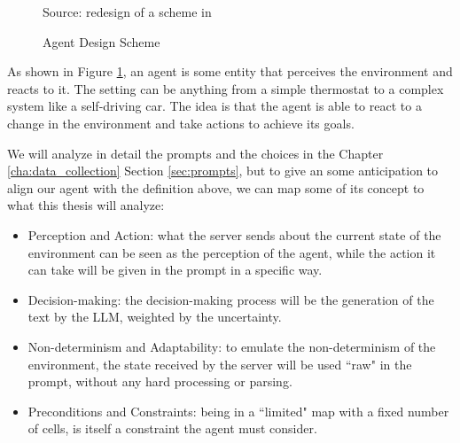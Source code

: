 \vspace{1cm} %
\begin{figure}[h!]
  \centering
  \caption{Agent Design Scheme}
  { Source: redesign of a scheme in \cite{wooldridge2002multiagent}} \label{fig:agent_scheme}
\end{figure}
\vspace{1cm} %

As shown in Figure \ref{fig:agent_scheme}, an agent is some entity that
perceives the environment and reacts to it. The setting can be anything from a simple
thermostat to a complex system like a self-driving car. The idea is that the
agent is able to react to a change in the environment and take actions to
achieve its goals.

We will analyze in detail the prompts and the choices in the Chapter
\ref{cha:data_collection} Section \ref{sec:prompts}, but to give an some anticipation
to align our agent with the definition above, we can map some of its concept to
what this thesis will analyze:
\begin{itemize}
  \item Perception and Action: what the server sends about the current state of
    the environment can be seen as the perception of the agent, while the action
    it can take will be given in the prompt in a specific way.

  \item Decision-making: the decision-making process will be the generation of
    the text by the LLM, weighted by the uncertainty.

  \item Non-determinism and Adaptability: to emulate the non-determinism of the
    environment, the state received by the server will be used ``raw" in the
    prompt, without any hard processing or parsing.

  \item Preconditions and Constraints: being in a ``limited" map with a fixed number
    of cells, is itself a constraint the agent must consider.
\end{itemize}

